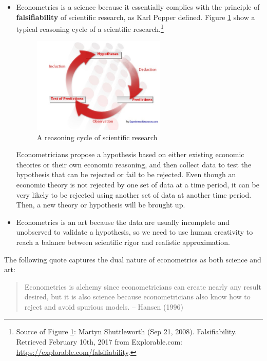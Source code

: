 \documentclass[a4paper,11pt]{article}
\begin{document}
\begin{itemize}
\item Econometrics is a science because it essentially complies with the
principle of \textbf{falsifiability} of scientific research, as Karl Popper
defined. Figure \ref{fig:org55366b7} show a typical reasoning cycle
of a scientific research.\footnote{Source of Figure \ref{fig:org55366b7}: Martyn Shuttleworth (Sep
21, 2008). Falsifiability. Retrieved February 10th, 2017 from Explorable.com:
\url{https://explorable.com/falsifiability}.}

\begin{figure}[htbp]
\centering
\includegraphics[width=0.6\textwidth]{figure/reasoning-cycle-research.jpg}
\caption{\label{fig:org55366b7}
A reasoning cycle of scientific research}
\end{figure}

Econometricians propose a hypothesis based on either existing economic
theories or their own economic reasoning, and then collect data to
test the hypothesis that can be rejected or fail to be rejected. Even
though an economic theory is not rejected by one set of data at a
time period, it can be very likely to be rejected using another set of
data at another time period. Then, a new theory or hypothesis will
be brought up.

\item Econometrics is an art because the data are usually incomplete and
unobserved to validate a hypothesis, so we need to use human
creativity to reach a balance between scientific rigor and realistic
approximation.
\end{itemize}

The following quote captures the dual nature of econometrics as both
science and art:
\begin{quote}
Econometrics is alchemy since econometricians can create nearly any
result desired, but it is also science because econometricians also
know how to reject and avoid spurious models. -- Hansen (1996)
\end{quote}
\end{document}
